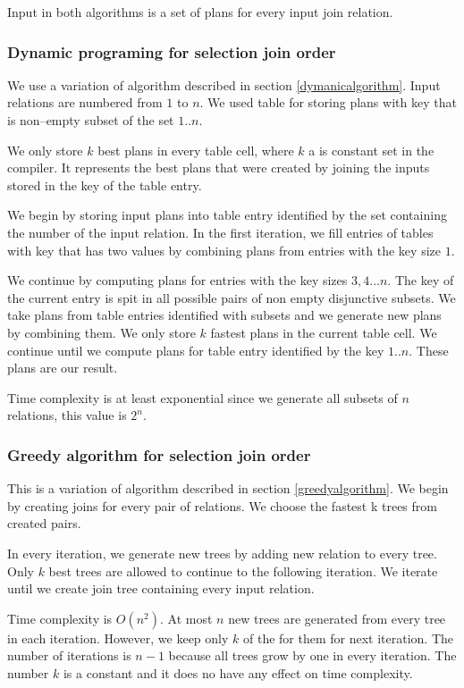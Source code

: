 Input in both algorithms is a set of plans for every input join relation.

\subsubsection{Dynamic programing for selection join order}

We use a variation of algorithm described in section \ref{dymanicalgorithm}. Input relations are numbered from $1$ to $n$. We used table for storing plans with key that is non--empty subset of the set ${1..n}$.

We only store $k$ best plans in every table cell, where $k$ a is constant set in the compiler. It represents the best plans that were created by joining the inputs stored in the key of the table entry.

We begin by storing input plans into table entry identified by the set containing the number of the input relation. In the first iteration, we fill entries of tables with key that has two values by combining plans from entries with the key size $1$.

We continue by computing plans for entries with the key sizes $3,4...n$. The key of the current entry is spit in all possible pairs of non empty disjunctive subsets. We take plans from table entries identified with subsets and we generate new plans by combining them. We only store $k$ fastest plans in the current table cell.
We continue until we compute plans for table entry identified by the key ${1..n}$. These plans are our result.

Time complexity is at least exponential since we generate all subsets of $n$ relations, this value is $2^n$.


\subsubsection{Greedy algorithm for selection join order}
 This is a variation of algorithm described in section \ref{greedyalgorithm}. We begin by creating joins for every pair of relations. We choose the fastest k trees from created pairs.
 
 In every iteration, we generate new trees by adding new relation to every tree. Only $k$ best trees are allowed to continue to the following iteration. We iterate until we create join tree containing every input relation.
 
 Time complexity is $O(n^2)$. At most $n$ new trees are generated from every tree in each iteration. However, we keep only $k$ of the for them for next iteration. The number of iterations is $n-1$ because all trees grow by one in every iteration. The number $k$ is a constant and it does no have any effect on time complexity.
 

